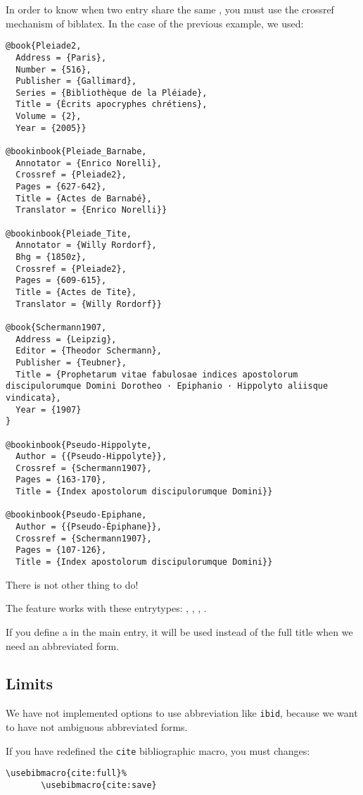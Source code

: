 \documentclass{ltxdockit}[2011/03/25]
\newcommand{\biblatex}{biblatex\xspace}
\begin{document}
In order to know when two entry share the same , you must use the crossref mechanism of \biblatex. In the case of the previous example, we used:
\begin{verbatim}
@book{Pleiade2,
  Address = {Paris},
  Number = {516},
  Publisher = {Gallimard},
  Series = {Bibliothèque de la Pléiade},
  Title = {Écrits apocryphes chrétiens},
  Volume = {2},
  Year = {2005}}

@bookinbook{Pleiade_Barnabe,
  Annotator = {Enrico Norelli},
  Crossref = {Pleiade2},
  Pages = {627-642},
  Title = {Actes de Barnabé},
  Translator = {Enrico Norelli}}

@bookinbook{Pleiade_Tite,
  Annotator = {Willy Rordorf},
  Bhg = {1850z},
  Crossref = {Pleiade2},
  Pages = {609-615},
  Title = {Actes de Tite},
  Translator = {Willy Rordorf}}

@book{Schermann1907,
  Address = {Leipzig},
  Editor = {Theodor Schermann},
  Publisher = {Teubner},
  Title = {Prophetarum vitae fabulosae indices apostolorum discipulorumque Domini Dorotheo · Epiphanio · Hippolyto aliisque vindicata},
  Year = {1907}
}

@bookinbook{Pseudo-Hippolyte,
  Author = {{Pseudo-Hippolyte}},
  Crossref = {Schermann1907},
  Pages = {163-170},
  Title = {Index apostolorum discipulorumque Domini}}

@bookinbook{Pseudo-Epiphane,
  Author = {{Pseudo-Épiphane}},
  Crossref = {Schermann1907},
  Pages = {107-126},
  Title = {Index apostolorum discipulorumque Domini}}
\end{verbatim}

There is not other thing to do!

The feature works with these entrytypes:  , , , . 

If you define a  in the main entry, it will be used instead of the full title when we need an abbreviated form.
\subsection{Limits}

We have not implemented options to use abbreviation like \verb+ibid+, because we want to have not ambiguous abbreviated forms. 

If you have redefined the \verb+cite+ bibliographic macro, you must changes:
\begin{verbatim}
\usebibmacro{cite:full}%
       \usebibmacro{cite:save}
\end{verbatim}
\end{document}
